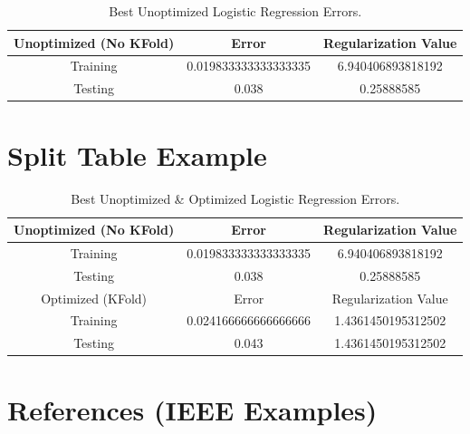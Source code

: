 \documentclass{article}
\begin{document}

    \begin{table}[h!]
    \centering
    \begin{tabular}{|c | c | c |} 
     \hline
     Unoptimized (No KFold) & Error & Regularization Value\\
     \hline
    Training & 0.019833333333333335 & 6.940406893818192 \\ 
    \hline
     Testing & 0.038 & 0.25888585 \\
     \hline
    \end{tabular}
    \caption{Best Unoptimized Logistic Regression Errors.}
    \label{table:1}
    \end{table}


\FloatBarrier

\section{Split Table Example}

    \begin{table}[h!]
    \centering
    \begin{tabular}{|c | c | c |} 
    \hline
    Unoptimized (No KFold) & Error & Regularization Value\\
    \hline
    Training & 0.019833333333333335 & 6.940406893818192 \\ 
    \hline
    Testing & 0.038 & 0.25888585 \\
    \hline\hline
    Optimized (KFold) & Error & Regularization Value\\
    \hline
    Training & 0.024166666666666666 & 1.4361450195312502 \\ 
    \hline
     Testing & 0.043 & 1.4361450195312502 \\
     \hline
    \end{tabular}
    \caption{Best Unoptimized \& Optimized Logistic Regression Errors.}
    \label{table:3}
    \end{table}
 
\section{References (IEEE Examples)}
\end{document}
